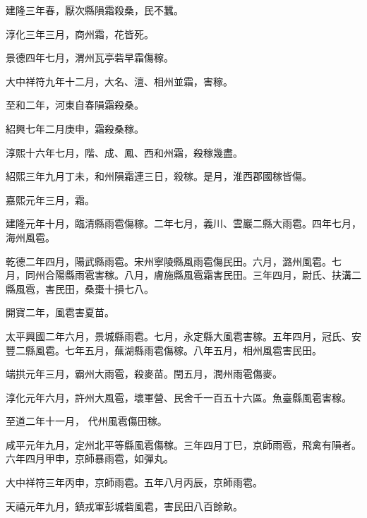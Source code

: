 \begin{pinyinscope}
 建隆三年春，厭次縣隕霜殺桑，民不蠶。



 淳化三年三月，商州霜，花皆死。



 景德四年七月，渭州瓦亭砦早霜傷稼。



 大中祥符九年十二月，大名、澶、相州並霜，害稼。



 至和二年，河東自春隕霜殺桑。



 紹興七年二月庚申，霜殺桑稼。



 淳熙十六年七月，階、成、鳳、西和州霜，殺稼幾盡。



 紹熙三年九月丁未，和州隕霜連三日，殺稼。是月，淮西郡國稼皆傷。



 嘉熙元年三月，霜。



 建隆元年十月，臨清縣雨雹傷稼。二年七月，義川、雲巖二縣大雨雹。四年七月，海州風雹。



 乾德二年四月，陽武縣雨雹。宋州寧陵縣風雨雹傷民田。六月，潞州風雹。七
 月，同州合陽縣雨雹害稼。八月，膚施縣風雹霜害民田。三年四月，尉氏、扶溝二縣風雹，害民田，桑棗十損七八。



 開寶二年，風雹害夏苗。



 太平興國二年六月，景城縣雨雹。七月，永定縣大風雹害稼。五年四月，冠氏、安豐二縣風雹。七年五月，蕪湖縣雨雹傷稼。八年五月，相州風雹害民田。



 端拱元年三月，霸州大雨雹，殺麥苗。閏五月，潤州雨雹傷麥。



 淳化元年六月，許州大風雹，壞軍營、民舍千一百五十六區。魚臺縣風雹害稼。



 至道二年十一月，
 代州風雹傷田稼。



 咸平元年九月，定州北平等縣風雹傷稼。三年四月丁巳，京師雨雹，飛禽有隕者。六年四月甲申，京師暴雨雹，如彈丸。



 大中祥符三年丙申，京師雨雹。五年八月丙辰，京師雨雹。



 天禧元年九月，鎮戎軍彭城砦風雹，害民田八百餘畝。




\end{pinyinscope}

